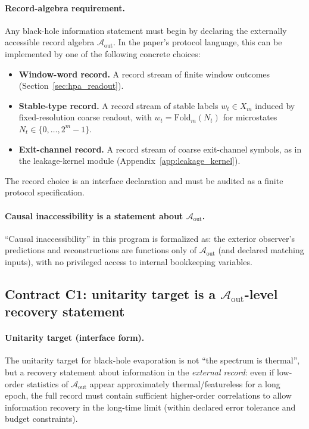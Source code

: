 \paragraph{Record-algebra requirement.}
\AuditTag Any black-hole information statement must begin by declaring the externally accessible
record algebra $\mathcal{A}_{\mathrm{out}}$.
In the paper's protocol language, this can be implemented by one of the following concrete choices:
\begin{itemize}
\item \textbf{Window-word record.} A record stream of finite window outcomes (Section~\ref{sec:hpa_readout}).
\item \textbf{Stable-type record.} A record stream of stable labels $w_t\in X_m$ induced by fixed-resolution
coarse readout, with $w_t=\mathrm{Fold}_m(N_t)$ for microstates $N_t\in\{0,\dots,2^m-1\}$.
\item \textbf{Exit-channel record.} A record stream of coarse exit-channel symbols, as in the leakage-kernel
module (Appendix~\ref{app:leakage_kernel}).
\end{itemize}
The record choice is an \InterfaceTag interface declaration and must be audited as a finite protocol specification.

\paragraph{Causal inaccessibility is a statement about $\mathcal{A}_{\mathrm{out}}$.}
\AuditTag ``Causal inaccessibility'' in this program is formalized as: the exterior observer's
predictions and reconstructions are functions only of $\mathcal{A}_{\mathrm{out}}$ (and declared matching inputs),
with no privileged access to internal bookkeeping variables.

\subsection{Contract C1: unitarity target is a \texorpdfstring{$\mathcal{A}_{\mathrm{out}}$}{Aout}-level recovery statement}
\label{subsec:bh_contract_unitarity_target}

\paragraph{Unitarity target (interface form).}
\InterfaceTag The unitarity target for black-hole evaporation is not ``the spectrum is thermal'',
but a recovery statement about information in the \emph{external record}:
even if low-order statistics of $\mathcal{A}_{\mathrm{out}}$ appear approximately thermal/featureless for a long
epoch, the full record must contain sufficient higher-order correlations to allow information recovery
in the long-time limit (within declared error tolerance and budget constraints).

